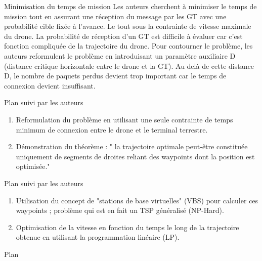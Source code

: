 \begin{frame}{Minimisation du temps de mission}
Les auteurs cherchent à minimiser le temps de mission tout en assurant une réception du message par les GT avec une probabilité cible fixée à l'avance. Le tout sous la contrainte de vitesse maximale du drone. La probabilité de réception d'un GT est difficile à évaluer car c'est fonction compliquée de la trajectoire du drone. Pour contourner le problème, les auteurs reformulent le problème en introduisant un paramètre auxiliaire D (distance critique horizontale entre le drone et la GT). Au delà de cette distance D, le nombre de paquets perdus devient trop important car le temps de connexion devient insuffisant. 


\end{frame}


\newcommand{\asuivre}{\setcounter{sauvegardeenumi}{\theenumi}}
\newcommand{\suite}{\setcounter{enumi}{\thesauvegardeenumi}}

\begin{frame}{Plan suivi par les auteurs}

\begin{enumerate}
	
	\item Reformulation du problème en utilisant une seule contrainte
	de temps minimum de connexion entre le drone et le terminal terrestre.	
	\item Démonstration du théorème : " la trajectoire optimale
	peut-être constituée uniquement de segments de droites reliant des
	waypoints dont la position est optimisée."

	
\end{enumerate}
\asuivre
\end{frame}

\begin{frame}{Plan suivi par les auteurs}
 
\begin{enumerate}
	\suite
	\item Utilisation du concept de "stations de base virtuelles" (VBS) pour calculer ces waypoints ;  problème qui est en fait un TSP généralisé (NP-Hard).

	\item Optimisation de la vitesse en fonction du temps le long de la trajectoire obtenue
	en utilisant la programmation linéaire (LP).

\end{enumerate}

\end{frame}


\begin{frame}{Plan}
	\tableofcontents
\end{frame}
